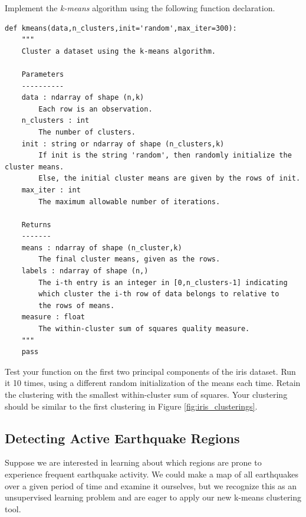 \begin{problem}
Implement the \emph{k-means} algorithm using the following function declaration.

\begin{lstlisting}
def kmeans(data,n_clusters,init='random',max_iter=300):
    """
    Cluster a dataset using the k-means algorithm.

    Parameters
    ----------
    data : ndarray of shape (n,k)
        Each row is an observation.
    n_clusters : int
        The number of clusters.
    init : string or ndarray of shape (n_clusters,k)
        If init is the string 'random', then randomly initialize the cluster means.
        Else, the initial cluster means are given by the rows of init.
    max_iter : int
        The maximum allowable number of iterations.

    Returns
    -------
    means : ndarray of shape (n_cluster,k)
        The final cluster means, given as the rows.
    labels : ndarray of shape (n,)
        The i-th entry is an integer in [0,n_clusters-1] indicating
        which cluster the i-th row of data belongs to relative to
        the rows of means.
    measure : float
        The within-cluster sum of squares quality measure.
    """
    pass
\end{lstlisting}

Test your function on the first two principal components of the iris dataset.
Run it 10 times, using a different random initialization of the means each time.
Retain the clustering with the smallest within-cluster sum of squares.
Your clustering should be similar to the first clustering in Figure \ref{fig:iris_clusterings}.
\end{problem}

\subsection*{Detecting Active Earthquake Regions}
Suppose we are interested in learning about which regions are prone to experience frequent earthquake activity.
We could make a map of all earthquakes over a given period of time and examine it ourselves, but we recognize this as an unsupervised learning problem and are eager to apply our new k-means clustering tool.

